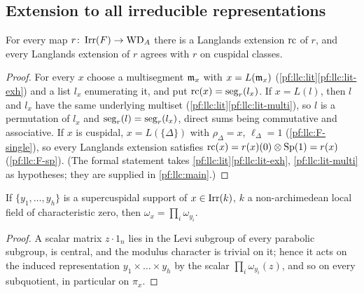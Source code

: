 \subsection{Extension to all irreducible representations}\label{pf:llc:sec-ext}

\begin{proposition}\label{pf:llc:lext}
For every map $r\colon\operatorname{Irr}(F)\to\mathrm{WD}_A$ there is a Langlands extension $\mathrm{rc}$ of $r$, and every Langlands extension of
$r$ agrees with $r$ on cuspidal classes. 
\end{proposition}

\begin{proof}
For every $x$ choose a multisegment $\mathfrak m_x$ with $x=L(\mathfrak m_x)$ (\cref{pf:llc:lit}\ref{pf:llc:lit-exh}) and a list $l_x$
enumerating it, and put $\mathrm{rc}(x)=\operatorname{seg}_r(l_x)$. If $x=L(l)$, then $l$ and $l_x$ have the same underlying multiset
(\cref{pf:llc:lit}\ref{pf:llc:lit-multi}), so $l$ is a permutation of $l_x$ and $\operatorname{seg}_r(l)=\operatorname{seg}_r(l_x)$, direct sums
being commutative and associative. If $x$ is cuspidal, $x=L(\{\Delta\})$ with $\rho_\Delta=x$, $\ell_\Delta=1$
(\ref{pf:llc:F-single}), so every Langlands extension satisfies $\mathrm{rc}(x)=r(x)(0)\otimes\operatorname{Sp}(1)=r(x)$ (\ref{pf:llc:F-sp}).
(The formal statement takes \cref{pf:llc:lit}\ref{pf:llc:lit-exh}, \ref{pf:llc:lit-multi} as hypotheses; they are
supplied in \cref{pf:llc:main}.)
\end{proof}

\begin{lemma}\label{pf:llc:centralsupp}
If $\{y_1,\dots,y_h\}$ is a supercuspidal support of $x\in\operatorname{Irr}(k)$, $k$ a non-archimedean local field of characteristic
zero, then $\omega_x=\prod_i\omega_{y_i}$.
\end{lemma}

\begin{proof}
A scalar matrix $z\cdot1_n$ lies in the Levi subgroup of every parabolic subgroup, is central, and the modulus character is
trivial on it; hence it acts on the induced representation $y_1\times\dots\times y_h$ by the scalar $\prod_i\omega_{y_i}(z)$,
and so on every subquotient, in particular on $\pi_x$.
\end{proof}


